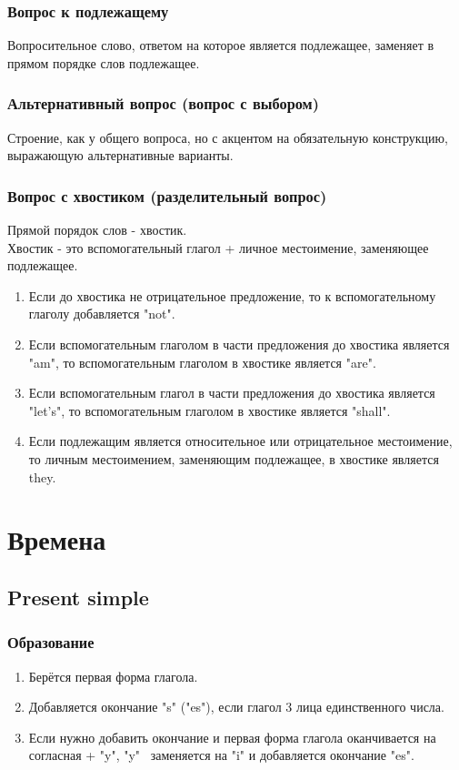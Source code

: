 \documentclass[oneside]{book}
\begin{document}
	\subsection{Вопрос к подлежащему}
	Вопросительное слово, ответом на которое является подлежащее,
	заменяет в прямом порядке слов подлежащее.

	\subsection{Альтернативный вопрос (вопрос с выбором)}
	Строение, как у общего вопроса, но с акцентом на обязательную конструкцию,
	выражающую альтернативные варианты.

	\subsection{Вопрос с хвостиком (разделительный вопрос)}
	Прямой порядок слов - хвостик.
	\\
	Хвостик - это вспомогательный глагол + личное местоимение, заменяющее подлежащее.

	\begin{enumerate}
		\item Если до хвостика не отрицательное предложение, то
		к вспомогательному глаголу добавляется "not".

		\item Если вспомогательным глаголом в части предложения до хвостика является "am"{},
		то вспомогательным глаголом в хвостике является "are".

		\item Если вспомогательным глагол в части предложения до хвостика является "let's"{},
		то вспомогательным глаголом в хвостике является "shall".

		\item Если подлежащим является относительное или отрицательное местоимение,
		то личным местоимением, заменяющим подлежащее, в хвостике является they.
	\end{enumerate}

	\chapter{Времена}
	\section{Present simple}
	\subsection{Образование}
	\begin{enumerate}
		\item Берётся первая форма глагола.

		\item Добавляется окончание "s" ("es"), если глагол 3 лица единственного числа.

		\item Если нужно добавить окончание и первая форма глагола оканчивается на согласная + "y"{},
		"y" \ заменяется на "i" и добавляется окончание "es".
	\end{enumerate}
\end{document}
